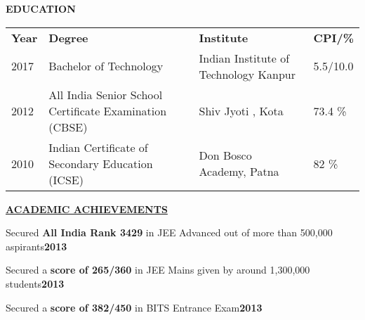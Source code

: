 \documentclass[letterpaper]{deedy-resume} %
\begin{document}
{\uppercase{\textbf{\large{Education}}\hfill}}
\microspace
\begin{tabular}{|l|l|l|l|}
\cline{1-4}
\textbf{\hspace{10pt}Year\hspace{10pt} }&\textbf{\hspace{100pt}Degree}&\textbf{\hspace{60pt}Institute}&\textbf{\hspace{10pt}CPI/\%}\\
\cline{1-4}
\hspace{10pt}2017& \hspace{66pt}Bachelor of Technology&\hspace{5pt}Indian Institute of Technology Kanpur\hspace{10pt} &\hspace{10pt}5.5/10.0\\
\hspace{10pt}2012& All India Senior School Certificate Examination (CBSE) &\hspace{47pt}Shiv Jyoti , Kota\hspace{45pt}&\hspace{10pt}73.4 \%\\
\hspace{10pt}2010&\hspace{17pt}Indian Certificate of Secondary Education (ICSE)\hspace{17pt} &\hspace{26pt}Don Bosco Academy, Patna\hspace{24pt}&\hspace{10pt}82 \%\\
\cline{1-4}
\end{tabular}
\microspace

{\uppercase\uline{\textbf{\large{Academic  Achievements}}\hfill}}
\begin{tightitemize}
\item Secured \textbf{All India Rank 3429} in JEE Advanced out of more than 500,000 aspirants\hfill{\textbf{2013}}
\item Secured a \textbf{score of 265/360} in JEE Mains given by around 1,300,000 students\hfill{\textbf{2013}}
\item Secured a \textbf{score of 382/450} in BITS Entrance Exam\hfill{\textbf{2013}}
\end{tightitemize}

\sectionspace %
\end{document}
